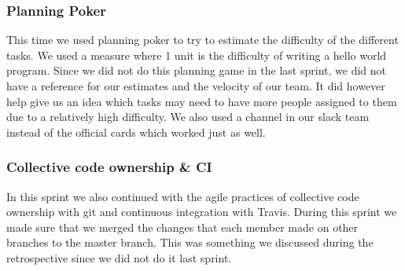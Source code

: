 \documentclass[14]{article}
\begin{document}
\subsubsection{Planning Poker}
This time we used planning poker to try to estimate the difficulty of the different tasks. We used a measure where 1 unit is the difficulty of writing a hello world program. Since we did not do this planning game in the last sprint, we did not have a reference for our estimates and the velocity of our team. It did however help give us an idea which tasks may need to have more people assigned to them due to a relatively high difficulty. We also used a channel in our slack team instead of the official cards which worked just as well. 

\subsubsection{Collective code ownership \& CI}
In this sprint we also continued with the agile practices of collective code ownership with git and continuous integration with Travis. During this sprint we made sure that we merged the changes that each member made on other branches to the master branch. This was something we discussed during the retrospective since we did not do it last sprint. 
\end{document}
